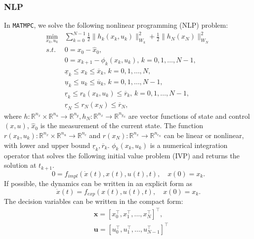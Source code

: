\documentclass{article}
\newcommand{\software}[1]{{\tt#1}}
\newcommand{\norm}[1]{\lVert#1\rVert}
\begin{document}
\subsubsection{NLP}
In \software{MATMPC}, we solve the following nonlinear programming (NLP) problem:
\begin{subequations}\label{NLP}
	\begin{equation}
	\begin{aligned}
	\min_{x_k,u_k} \,&\sum_{k=0}^{N-1} \frac{1}{2}\norm{h_k(x_k,u_k)}_{W_k}^2+\frac{1}{2}\norm{h_N(x_N)}_{W_N}^2\\
	s.t.\, &0=x_0-\hat{x}_0,\\
	&0=x_{k+1}-\phi_k(x_k,u_k),\, k=0,1,\ldots,N-1,\\
	&\underline{x}_k\leq x_k\leq \overline{x}_k,\,k=0,1,\ldots,N,\\
	&\underline{u}_k\leq u_k\leq \overline{u}_k,\,k=0,1,\ldots,N-1,\\
	&\underline{r}_k\leq r_k(x_k,u_k)\leq \overline{r}_k, \,k=0,1,\ldots,N-1,\\
	&\underline{r}_N\leq r_N(x_N)\leq \overline{r}_N,
	\end{aligned}
	\end{equation}
\end{subequations}
where $h:\mathbb{R}^{n_x}\times\mathbb{R}^{n_u}\rightarrow \mathbb{R}^{n_y},h_N:\mathbb{R}^{n_x}\rightarrow\mathbb{R}^{n_{y_N}}$ are vector functions of state and control $(x,u)$, $\hat{x}_0$ is the measurement of the current state. The function $r(x_k,u_k): \mathbb{R}^{n_x}\times\mathbb{R}^{n_u} \rightarrow \mathbb{R}^{n_c}$ and $r(x_N): \mathbb{R}^{n_x}\rightarrow \mathbb{R}^{n_{c_N}}$ can be linear or nonlinear, with lower and upper bound $\underline{r}_k, \overline{r}_k$. $\phi_k(x_k,u_k)$ is a numerical integration operator that solves the following initial value problem (IVP) and returns the solution at $t_{k+1}$.
\begin{equation}
0=f_{impl}(\dot{x}(t), x(t),u(t),t),\quad x(0)=x_k.
\end{equation}
If possible, the dynamics can be written in an explicit form as
\begin{equation}
\dot{x}(t)=f_{exp}(x(t),u(t),t),\quad x(0)=x_k.
\end{equation}
The decision variables can be written in the compact form:
\begin{equation}
\begin{aligned}
&\mathbf{x}= \left [x_0^\top, x_1^\top,\dots, x_N^\top\right ]^\top,\\
&\mathbf{u}= \left [u_0^\top, u_1^\top,\dots, u_{N-1}^\top\right ]^\top
\end{aligned}
\end{equation}
\end{document}
